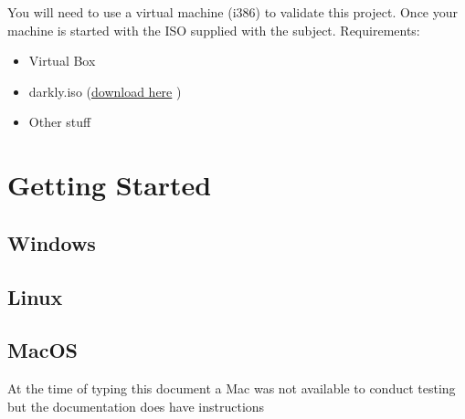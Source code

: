 You will need to use a virtual machine 
(i386) to validate this project. Once your
machine is started with the ISO supplied with the subject.
Requirements:
\begin{itemize}
    \item Virtual Box
    \item darkly.iso (\href{https://drive.google.com/file/d/145dbZHjZWyMiRscj-72jE3n5PM5vXyB9/view?usp=sharing}{download here} )
    \item Other stuff
\end{itemize}

\section{Getting Started}

\subsection{Windows}






\subsection{Linux}

%

\subsection{MacOS}
At the time of typing this document a Mac was not available to conduct testing
but the documentation\cite{Docker:Mac_Install} does have instructions




